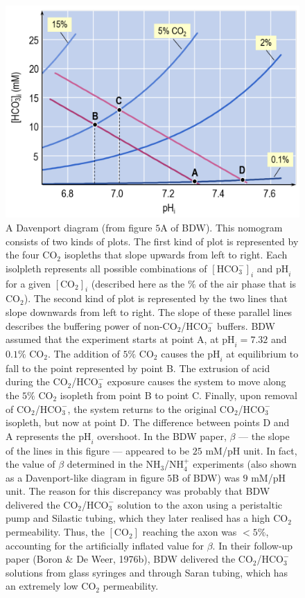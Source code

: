 \documentclass[fleqn,10pt]{physiome}
\begin{document}
\begin{figure}
\centering
\includegraphics[scale=0.2]{Figure 7.png}
\caption{\label{fig:7} A Davenport diagram (from figure $5$A of BDW). This nomogram consists of two kinds of plots. The first kind of plot is represented by the four $\mathrm{CO_2}$ isopleths that slope upwards from left to right. Each isolpleth represents all possible combinations of $\mathrm{[HCO_3^-]}_i$ and $\mathrm{pH}_i$ for a given $\mathrm{[CO_2]}_i$ (described here as the $\%$ of the air phase that is $\mathrm{CO_2}$). The second kind of plot is represented by the two lines that slope downwards from left to right. The slope of these parallel lines describes the buffering power of non-$\mathrm{CO_2}$/$\mathrm{HCO_3^-}$ buffers. BDW assumed that the experiment starts at point A, at $\mathrm{pH}_i = 7.32$ and $0.1\%$ $\mathrm{CO_2}$. The addition of $5\%$ $\mathrm{CO_2}$ causes the $\mathrm{pH}_i$ at equilibrium to fall to the point represented by point B. The extrusion of acid during the $\mathrm{CO_2}$/$\mathrm{HCO_3^-}$ exposure causes the system to move along the $5\%$ $\mathrm{CO_2}$ isopleth from point B to point C. Finally, upon removal of $\mathrm{CO_2}$/$\mathrm{HCO_3^-}$, the system returns to the original $\mathrm{CO_2}$/$\mathrm{HCO_3^-}$ isopleth, but now at point D. The difference between points D and A represents the $\mathrm{pH}_i$ overshoot. In the BDW paper, $\beta$ --- the slope of the lines in this figure --- appeared to be $25$ mM/$\mathrm{pH}$ unit. In fact, the value of $\beta$ determined in the $\mathrm{NH_3}$/$\mathrm{NH_4^+}$ experiments (also shown as a Davenport-like diagram in figure $5$B of BDW) was $9$ mM/$\mathrm{pH}$ unit. The reason for this discrepancy was probably that BDW delivered the $\mathrm{CO_2}$/$\mathrm{HCO_3^-}$ solution to the axon using a peristaltic pump and Silastic tubing, which they later realised has a high $\mathrm{CO_2}$ permeability. Thus, the $\mathrm{[CO_2]}$ reaching the axon was $<5\%$, accounting for the artificially inflated value for $\beta$. In their follow-up paper (Boron \& De Weer, 1976b), BDW delivered the $\mathrm{CO_2}$/$\mathrm{HCO_3^-}$ solutions from glass syringes and through Saran tubing, which has an extremely low $\mathrm{CO_2}$ permeability.}
\end{figure}
\end{document}
